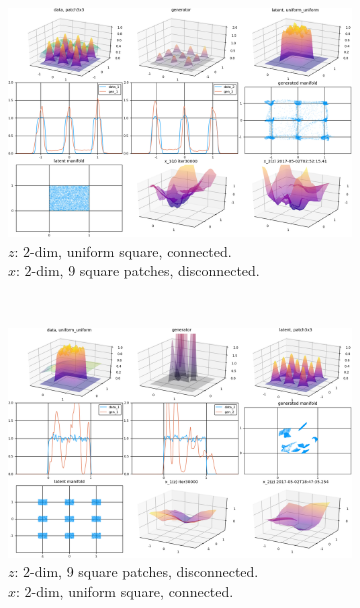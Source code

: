 \begin{figure}[ht]
\centering
    \begin{subfigure}[t]{0.45\textwidth}
        \includegraphics[width=\linewidth]{"fig/uniformuniform_patch3x3_00030000"}
        \caption{$z$: $2$-dim, uniform square, connected.\\
            $x$: $2$-dim, 9 square patches, disconnected.}
    \end{subfigure}
    ~
    \begin{subfigure}[t]{0.45\textwidth}
        \includegraphics[width=\linewidth]{"fig/patch3x3_uniformuniform_00030000"}
        \caption{$z$: $2$-dim, 9 square patches, disconnected.\\
            $x$: $2$-dim, uniform square, connected.}
    \end{subfigure}
    \vskip 0.4cm
    \begin{subfigure}[t]{0.45\textwidth}

\end{subfigure}
\end{figure}
